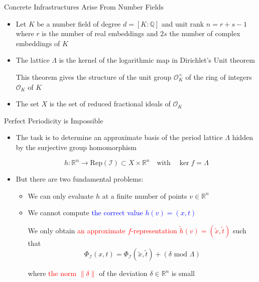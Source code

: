 \documentclass{beamer}
\newcommand{\Q}{\mathbb{Q}}
\newcommand{\R}{\mathbb{R}}
\newcommand{\cI}{\mathcal{I}}
\renewcommand{\>}{\rangle}
\newcommand{\<}{\langle}
\begin{document}

\begin{frame}{Concrete Infrastructures Arise From Number Fields}

\begin{itemize}
\item Let $K$ be a number field of degree $d=[K:\Q]$ and unit rank $n=r+s-1$ where $r$ is the number of real embeddings and $2s$ the number of complex embeddings of $K$
\medskip
\item The lattice $\Lambda$ is the kernel of the logarithmic map in Dirichlet's Unit theorem

\medskip
This theorem gives the structure of the unit group $\mathcal{O}_K^\times$ of the ring of integers $\mathcal{O}_K$ of $K$

\medskip
\item The set $X$ is the set of reduced fractional ideals of $\mathcal{O}_K$ 
\end{itemize}

\end{frame}


\begin{frame}{Perfect Periodicity is Impossible}

\begin{itemize}
\item The task is to determine an approximate basis of the period lattice $\Lambda$ hidden by the surjective group homomorphism

\[
h : \R^n \rightarrow \mathrm{Rep}(\mathcal{I})\subset X \times \R^n \quad \mbox{with}\quad
\ker f = \Lambda
\]

\item But there are two fundamental problems:

\medskip
\begin{itemize}
\item We can only evaluate $h$ at a finite number of points $v\in\R^n$

\medskip
\item We cannot compute \textcolor{blue}{the correct value $h(v)=(x,t)$}

\bigskip
We only obtain \textcolor{red}{an approximate $f$-representation $\tilde{h}(v)=(\tilde{x},\tilde{t})$} such that
\[
\Phi_\cI(x,t)  = \Phi_\cI(\tilde{x},\tilde{t}) + ( \delta \mbox{ mod } \Lambda)
\]

\medskip
where \textcolor{red}{the norm $\| \delta \|$} of the deviation $\delta\in\R^n$ is small

\end{itemize}

\end{itemize}

\end{frame}
\end{document}

